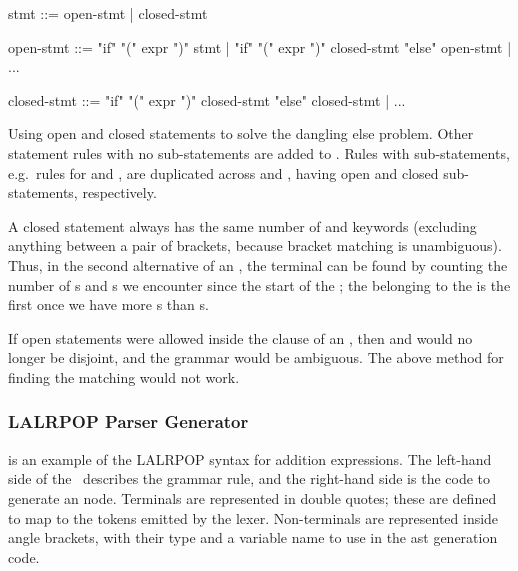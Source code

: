 \documentclass[00-main.tex]{subfiles}
\begin{document}
\begin{listing}[t]
  \begin{GrammarListing}
    stmt        ::= open-stmt | closed-stmt

    open-stmt   ::= "if" "(" expr ")" stmt
                  | "if" "(" expr ")" closed-stmt "else" open-stmt
                  | ...

    closed-stmt ::= "if" "(" expr ")" closed-stmt "else" closed-stmt
                  | ...
  \end{GrammarListing}
  \caption{Using open and closed statements to solve the dangling else problem. Other statement rules with no sub-statements are added to . Rules with sub-statements, e.g.~rules for  and , are duplicated across  and , having open and closed sub-statements, respectively.\medskip}
  \label{lst:open/closed statement grammar}
\end{listing}

A closed statement always has the same number of  and  keywords (excluding anything between a pair of brackets, because bracket matching is unambiguous).
Thus, in the second alternative of an , the  terminal can be found by counting the number of s and s we encounter since the start of the ; the  belonging to the  is the first  once we have more s than s.

If open statements were allowed inside the  clause of an , then  and  would no longer be disjoint, and the grammar would be ambiguous. The above method for finding the matching  would not work.

\subsubsection{LALRPOP Parser Generator}

 is an example of the LALRPOP syntax for addition expressions.
The left-hand side of the~\RustInline{=>} describes the grammar rule, and the right-hand side is the code to generate an  node.
Terminals are represented in double quotes; these are defined to map to the tokens emitted by the lexer.
Non-terminals are represented inside angle brackets, with their type and a variable name to use in the \gls{ast} generation code.
\end{document}
